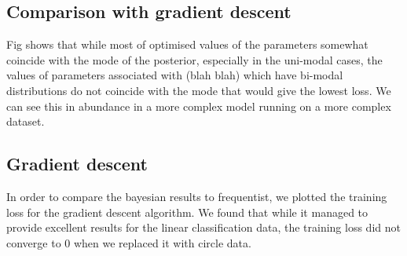 \subsection{Comparison with gradient descent}

Fig shows that while most of optimised values of the parameters somewhat coincide with the mode of the posterior, especially in the uni-modal cases, the values of parameters associated with (blah blah) which have bi-modal distributions do not coincide with the mode that would give the lowest loss. We can see this in abundance in a more complex model running on a more complex dataset. 


\subsection{Gradient descent}
In order to compare the bayesian results to frequentist, we plotted the training loss for the gradient descent algorithm. We found that while it managed to provide excellent results for the linear classification data, the training loss did not converge to 0 when we replaced it with circle data.